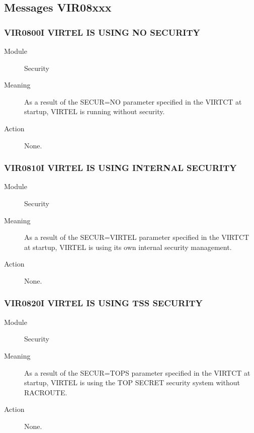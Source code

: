 \documentclass[letterpaper,10pt,english]{sphinxmanual}
\begin{document}
\subsection{Messages VIR08xxx}
\label{\detokenize{messages:messages-vir08xxx}}

\subsubsection{VIR0800I VIRTEL IS USING NO SECURITY}
\label{\detokenize{messages:vir0800i-virtel-is-using-no-security}}\begin{description}
\item[{Module}] \leavevmode
Security

\item[{Meaning}] \leavevmode
As a result of the SECUR=NO parameter specified in the VIRTCT at startup, VIRTEL is running without security.

\item[{Action}] \leavevmode
None.

\end{description}


\subsubsection{VIR0810I VIRTEL IS USING INTERNAL SECURITY}
\label{\detokenize{messages:vir0810i-virtel-is-using-internal-security}}\begin{description}
\item[{Module}] \leavevmode
Security

\item[{Meaning}] \leavevmode
As a result of the SECUR=VIRTEL parameter specified in the VIRTCT at startup, VIRTEL is using its own internal security management.

\item[{Action}] \leavevmode
None.

\end{description}


\subsubsection{VIR0820I VIRTEL IS USING TSS SECURITY}
\label{\detokenize{messages:vir0820i-virtel-is-using-tss-security}}\begin{description}
\item[{Module}] \leavevmode
Security

\item[{Meaning}] \leavevmode
As a result of the SECUR=TOPS parameter specified in the VIRTCT at startup, VIRTEL is using the TOP SECRET security system without RACROUTE.

\item[{Action}] \leavevmode
None.

\end{description}
\end{document}
